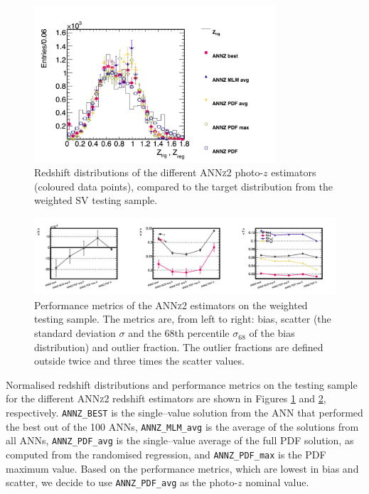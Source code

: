 \begin{figure}\centering \includegraphics[width=0.8\textwidth]{./chapters/chapter2/figs/regTrgZ.png}\caption{Redshift distributions of the different \textsc{ANNz2} photo-$z$ estimators (coloured data points), compared to the target distribution from the weighted SV testing sample.}\label{fig:annznz}\end{figure}
\begin{figure} \includegraphics[width=1.05\textwidth]{./chapters/chapter2/figs/avgMetric.png}\caption{Performance metrics of the \textsc{ANNz2} estimators on the weighted testing sample. The metrics are, from left to right: bias, scatter (the standard deviation $\sigma$ and the 68th percentile $\sigma_{68}$ of the bias distribution) and outlier fraction. The outlier fractions are defined outside twice and three times the scatter values. }\label{fig:annzmetric}\end{figure}

Normalised redshift distributions and performance metrics on the testing sample for the different \textsc{ANNz2} redshift estimators are shown in Figures \ref{fig:annznz} and \ref{fig:annzmetric}, respectively. \texttt{ANNZ\_BEST} is the single--value solution from the ANN that performed the best out of the 100 ANNs, \texttt{ANNZ\_MLM\_avg} is the average of the solutions from all ANNs, \texttt{ANNZ\_PDF\_avg} is the single--value average of the full PDF solution, as computed from the randomised regression, and \texttt{ANNZ\_PDF\_max} is the PDF maximum value. Based on the performance metrics, which are lowest in bias and scatter, we decide to use \texttt{ANNZ\_PDF\_avg} as the photo-$z$ nominal value.

